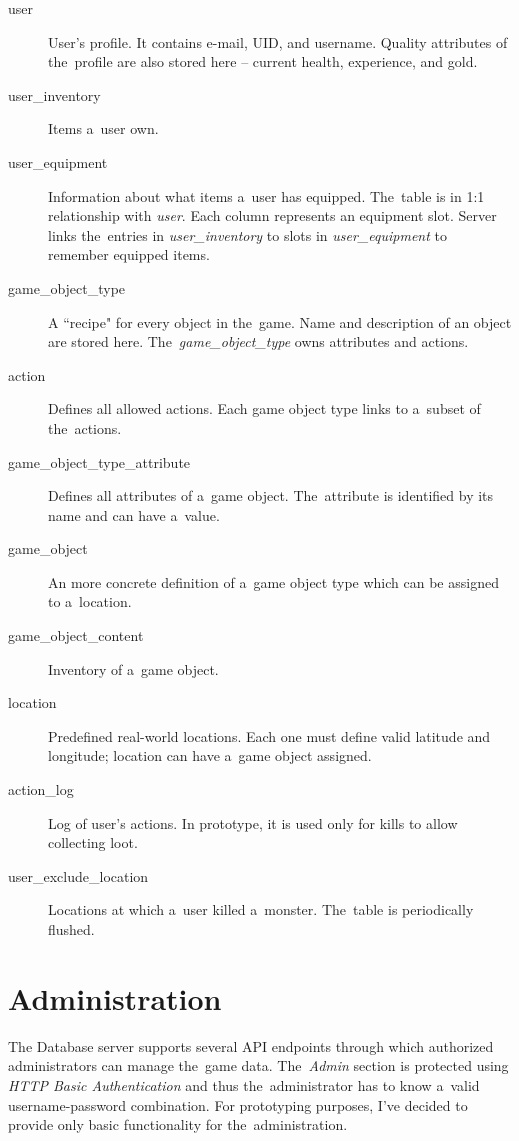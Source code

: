 	\begin{description}
		\item[user] User's profile. It contains e-mail, UID, and username. Quality attributes of the~profile are also stored here -- current health, experience, and gold.
		
		\item[user\_inventory] Items a~user own. 
		
		\item[user\_equipment] Information about what items a~user has equipped. The~table is in 1:1 relationship with \textit{user}. Each column represents an equipment slot. Server links the~entries in \textit{user\_inventory} to slots in \textit{user\_equipment} to remember equipped items.
		
		\item[game\_object\_type] A ``recipe" for every object in the~game. Name and description of an object are stored here. The~\textit{game\_object\_type} owns attributes and actions.
	
		\item[action] Defines all allowed actions. Each game object type links to a~subset of the~actions.
		
		\item[game\_object\_type\_attribute] Defines all attributes of a~game object. The~attribute is identified by its name and can have a~value.
	
		\item[game\_object] An more concrete definition of a~game object type which can be assigned to a~location.
	
		\item[game\_object\_content] Inventory of a~game object.
	
		\item[location] Predefined real-world locations. Each one must define valid latitude and longitude; location can have a~game object assigned. 
	
		\item[action\_log] Log of user's actions. In prototype, it is used only for kills to allow collecting loot.

		\item[user\_exclude\_location] Locations at which a~user killed a~monster. The~table is periodically flushed. 
		
	\end{description}

\section{Administration}
The Database server supports several API endpoints through which authorized administrators can manage the~game data. The~\textit{Admin} section is protected using \textit{HTTP Basic Authentication} and thus the~administrator has to know a~valid username-password combination. For prototyping purposes, I've decided to provide only basic functionality for the~administration.

